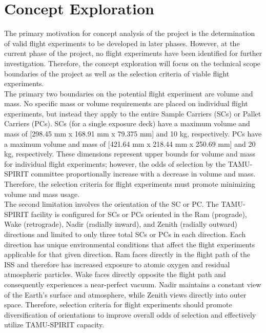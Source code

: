 \documentclass[conf]{new-aiaa}
\begin{document}
\clearpage
\section{Concept Exploration}

The primary motivation for concept analysis of the project is the determination of valid flight experiments to be developed in later phases.
However, at the current phase of the project, no flight experiments have been identified for further investigation.
Therefore, the concept exploration will focus on the technical scope boundaries of the project as well as the selection criteria of viable flight experiments. \\

The primary two boundaries on the potential flight experiment are volume and mass.
No specific mass or volume requirements are placed on individual flight experiments, but instead they apply to the entire Sample Carriers (SCs) or Pallet Carriers (PCs).
SCs (for a single exposure deck) have a maximum volume and mass of [298.45 mm x 168.91 mm x 79.375 mm] and 10 kg, respectively.
PCs have a maximum volume and mass of [421.64 mm x 218.44 mm x 250.69 mm] and 20 kg, respectively.
These dimensions represent upper bounds for volume and mass for individual flight experiments; however, the odds of selection by the TAMU-SPIRIT committee proportionally increase with a decrease in volume and mass.
Therefore, the selection criteria for flight experiments must promote minimizing volume and mass usage. \\

The second limitation involves the orientation of the SC or PC. The TAMU-SPIRIT facility is configured for SCs or PCs oriented in the Ram (prograde), Wake (retrograde), Nadir (radially inward), and Zenith (radially outward) directions and limited to only three total SCs or PCs in each direction.
Each direction has unique environmental conditions that affect the flight experiments applicable for that given direction.
Ram faces directly in the flight path of the ISS and therefore has increased exposure to atomic oxygen and residual atmospheric particles.
Wake faces directly opposite the flight path and consequently experiences a near-perfect vacuum.
Nadir maintains a constant view of the Earth's surface and atmosphere, while Zenith views directly into outer space.
Therefore, selection criteria for flight experiments should promote diversification of orientations to improve overall odds of selection and effectively utilize TAMU-SPIRIT capacity. \\
\end{document}
